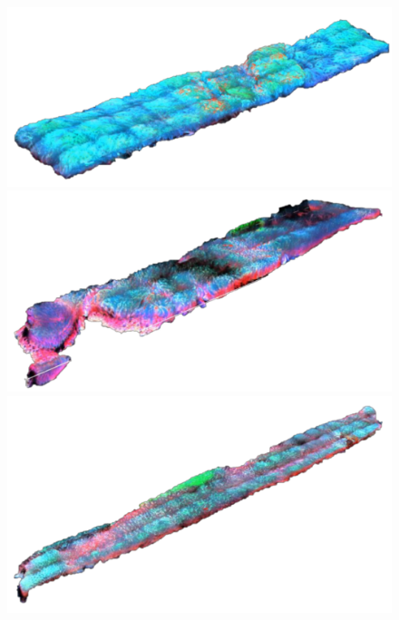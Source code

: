 \begin{figure}[H]
	\centering
	
	\begin{minipage}{0.45\columnwidth}
		\centering
		\includegraphics[clip, width=\linewidth]{fig/chapter3/3d_samples/sample_A_clip}
	\end{minipage}
	\begin{minipage}{0.45\linewidth}
		\centering
		\includegraphics[clip, width=\linewidth]{fig/chapter3/3d_samples/sample_B_clip}
	\end{minipage}
	\begin{minipage}{0.45\columnwidth}
		\centering
		\includegraphics[clip, width=\linewidth]{fig/chapter3/3d_samples/sample_C_clip}

\end{minipage}
\end{figure}
